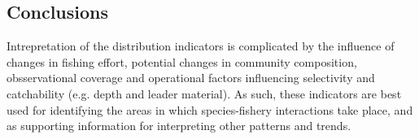 \documentclass[12pt]{SCreport}
\begin{document}

         

\clearpage         
        
     
          
  \subsection{Conclusions}
  
  
Intrepretation of the   distribution indicators is complicated by the influence of changes in fishing effort,  potential  changes in community composition, obsservational coverage  and operational factors influencing selectivity and catchability (e.g. depth and leader material). As such, these indicators are best used for identifying the areas in which species-fishery interactions take place, and as supporting information for interpreting other patterns and trends. 
\end{document}
